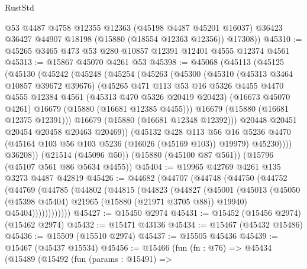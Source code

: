 \begin{lexlean}{RustStd}
\begin{coremodule}
        @53
        @4487
        @4758
        @12355
        @12363
        (@45198 @4487 @45201 @16037)
        @36423
        @36427
        @44907
        @18198
        (@15880 (@18554 @12363 @12356))
        @17308))
@45310 := @45265 @3465 @473 @53 @280 @10857 @12391 @12401 @4555 @12374 @4561
@45313 := @15867 @45070 @4261 @53
@45398 := @45068
    (@45113
      (@45125
        (@45130
          (@45242
            (@45248
              (@45254
                (@45263
                  (@45300
                    (@45310
                      (@45313 @3464 @10857 @39672 @39676)
                      (@45265
                        @471
                        @113
                        @53
                        @16
                        @5326
                        @4455
                        @4470
                        @4555
                        @12384
                        @4561
                        (@45313 @470 @5326 @20419 @20423)
                        (@16673 @45070 @4261)
                        @16679
                        (@15880 (@16681 @12385 @4455)))
                      @16679
                      (@15880 (@16681 @12375 @12391)))
                    @16679
                    (@15880 (@16681 @12348 @12392)))
                  @20448
                  @20451
                  @20454
                  @20458
                  @20463
                  @20469))
              (@45132
                @428
                @113
                @56
                @16
                @5236
                @4470
                (@45164 @103 @56 @103 @5236 (@16026 (@45169 @103)) @19979)
                @45230))))
        @36208))
    (@21514 (@45096 @50))
    (@15880 (@45100 @87 @561))
    (@15796 (@45107 @561 @86 @5634 @4455))
@45404 := @19965 @42769 @4261 @135 @3273 @4487 @42819
@45426 := @44682
    (@44707
      (@44748
        (@44750
          (@44752
            (@44769
              (@44785
                (@44802
                  (@44815
                    (@44823
                      (@44827
                        (@45001
                          (@45013
                            (@45050 (@45398 @45404) @21965 (@15880 (@21971 @3705 @88)) @19940)
                            @45404))))))))))))
@45427 := @15450 @2974
@45431 := @15452 (@15456 @2974) (@15462 @2974)
@45432 := @15471 @43136
@45434 := @15467 (@45432 @15486)
@45436 := @15509 (@15510 @2974)
@45437 := @15505 @45436
@45439 := @15467 (@45437 @15534)
@45456 := @15466
    (fun (fn : @76) =>
    @45434
      (@15489
        (@15492
          (fun (params : @15491) =>

\end{coremodule}
\end{lexlean}

